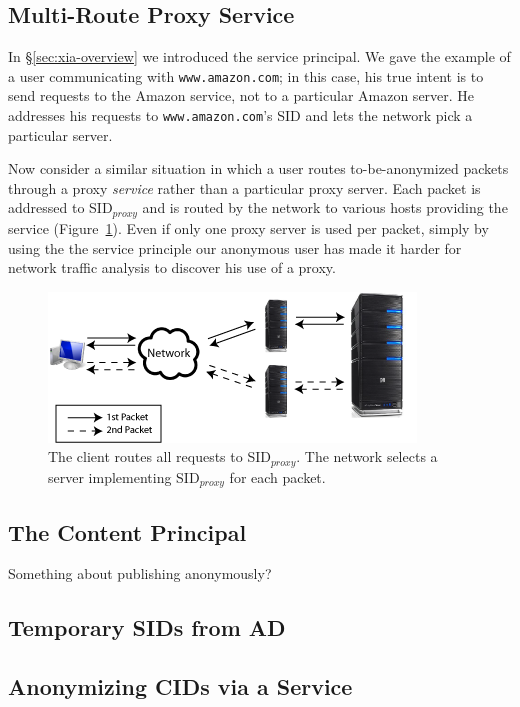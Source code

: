 \documentclass{article}
\begin{document}
\subsection{Multi-Route Proxy Service}
In \S\ref{sec:xia-overview} we introduced the service principal. We gave the example of a user communicating with \texttt{www.amazon.com}; in this case, his true intent is to send requests to the Amazon service, not to a particular Amazon server. He addresses his requests to \texttt{www.amazon.com}'s SID and lets the network pick a particular server.

Now consider a similar situation in which a user routes to-be-anonymized packets through a proxy \emph{service} rather than a particular proxy server. Each packet is addressed to SID$_{proxy}$ and is routed by the network to various hosts providing the service (Figure~\ref{fig:proxy-service}). Even if only one proxy server is used per packet, simply by using the the service principle our anonymous user has made it harder for network traffic analysis to discover his use of a proxy.
\begin{figure}
\includegraphics{images/proxy_service_multip_path.png}
\caption{The client routes all requests to SID$_{proxy}$. The network selects a server implementing SID$_{proxy}$ for each packet.}
\label{fig:proxy-service}
\end{figure}

\subsection{The Content Principal}
Something about publishing anonymously?

\subsection{Temporary SIDs from AD}

\subsection{Anonymizing CIDs via a Service}
\end{document}
